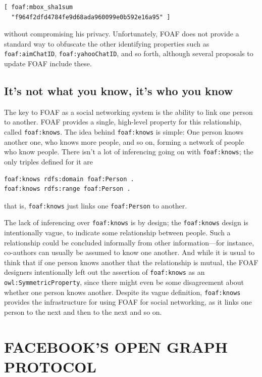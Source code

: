 \begin{lstlisting}
[ foaf:mbox_sha1sum
  "f964f2dfd4784fe9d68ada960099e0b592e16a95" ]
\end{lstlisting}

without compromising his privacy. Unfortunately, FOAF does not provide a
standard way to obfuscate the other identifying properties such as
\texttt{foaf:aimChatID}, \texttt{foaf:yahooChatID}, and so forth, although several
proposals to update FOAF include these.

\subsection{It's not what you know, it's who you know}

The key to FOAF as a social networking system is the ability to link one
person to another. FOAF provides a single, high-level property for this
relationship, called \texttt{foaf:knows}. The idea behind \texttt{foaf:knows} is simple:
One person knows another one, who knows more people, and so on, forming
a network of people who know people. There isn't a lot of inferencing
going on with \texttt{foaf:knows}; the only triples defined for it are

\begin{lstlisting}
foaf:knows rdfs:domain foaf:Person . 
foaf:knows rdfs:range foaf:Person .
\end{lstlisting}

that is, \texttt{foaf:knows} just links one \texttt{foaf:Person} to another.

The lack of inferencing over \texttt{foaf:knows} is by design; the \texttt{foaf:knows}
design is intentionally vague, to indicate some relationship between
people. Such a relationship could be concluded informally from other
information---for instance, co-authors can usually be assumed to know
one another. And while it is usual to think that if one person knows
another that the relationship is mutual, the FOAF designers
intentionally left out the assertion of \texttt{foaf:knows} as an
\texttt{owl:SymmetricProperty}, since there might even be some disagreement about
whether one person knows another. Despite its vague definition,
\texttt{foaf:knows} provides the infrastructure for using FOAF for social
networking, as it links one person to the next and then to the next and
so on.

\section{FACEBOOK'S OPEN GRAPH PROTOCOL}

